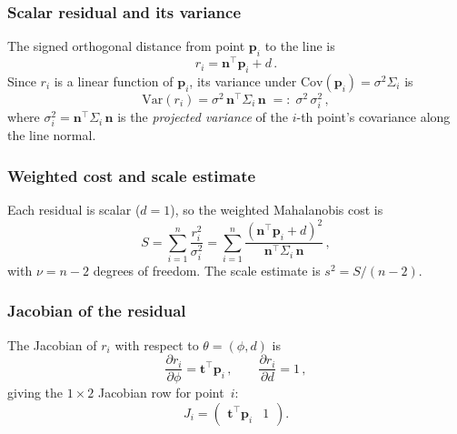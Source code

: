 \documentclass[11pt]{article}
\begin{document}
\subsubsection{Scalar residual and its variance}

The signed orthogonal distance from point $\mathbf{p}_i$ to the line is
\begin{equation}
  r_i = \mathbf{n}^\top \mathbf{p}_i + d\,.
\end{equation}
Since $r_i$ is a linear function of $\mathbf{p}_i$, its variance under
$\mathrm{Cov}(\mathbf{p}_i) = \sigma^2 \Sigma_i$ is
\begin{equation}
  \mathrm{Var}(r_i) = \sigma^2\, \mathbf{n}^\top \Sigma_i\, \mathbf{n}
  \;=:\; \sigma^2\, \sigma_i^2\,,
\end{equation}
where $\sigma_i^2 = \mathbf{n}^\top \Sigma_i\, \mathbf{n}$ is the
\emph{projected variance} of the $i$-th point's covariance along the
line normal.

\subsubsection{Weighted cost and scale estimate}

Each residual is scalar ($d = 1$), so the weighted Mahalanobis cost is
\begin{equation}
  S = \sum_{i=1}^n \frac{r_i^2}{\sigma_i^2}
    = \sum_{i=1}^n \frac{(\mathbf{n}^\top \mathbf{p}_i + d)^2}
                        {\mathbf{n}^\top \Sigma_i\, \mathbf{n}}\,,
\end{equation}
with $\nu = n - 2$ degrees of freedom. The scale estimate is
$s^2 = S/(n - 2)$.

\subsubsection{Jacobian of the residual}

The Jacobian of $r_i$ with respect to $\theta = (\phi, d)$ is
\begin{equation}
  \frac{\partial r_i}{\partial \phi}
  = \mathbf{t}^\top \mathbf{p}_i\,,
  \qquad
  \frac{\partial r_i}{\partial d} = 1\,,
\end{equation}
giving the $1 \times 2$ Jacobian row for point~$i$:
\begin{equation}
  J_i = \begin{pmatrix} \mathbf{t}^\top \mathbf{p}_i & 1 \end{pmatrix}.
\end{equation}
\end{document}
